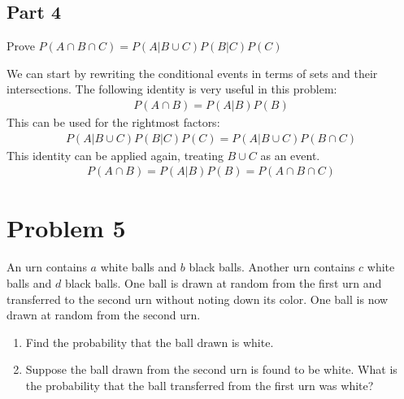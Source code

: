 \documentclass{article}
\begin{document}
\subsection*{Part 4}
Prove $P(A\cap B \cap C) = P(A|B\cup C) P(B|C) P(C)$

We can start by rewriting the conditional events in terms of sets and their intersections.
The following identity is very useful in this problem:
\begin{align*}
P(A\cap B) = P(A|B)P(B)
\end{align*}
This can be used for the rightmost factors:
\begin{align*}
P(A|B\cup C) P(B|C) P(C) = P(A|B\cup C) P(B\cap C)
\end{align*}
This identity can be applied again, treating $B\cup C$ as an event.
\begin{align*}
\boxed{P(A\cap B) = P(A|B)P(B) = P(A\cap B \cap C)}
\end{align*}
\clearpage

\section*{Problem 5}
An urn contains $a$ white balls and $b$ black balls. Another urn contains $c$ white balls and $d$ black balls. One ball is drawn at random from the first urn and transferred to the second urn without noting down its color. One ball is now drawn at random from the second urn.

\begin{enumerate}
    \item
    Find the probability that the ball drawn is white.
    \item
    Suppose the ball drawn from the second urn is found to be white. What is the probability that the ball transferred from the first urn was white?
    \end{enumerate}
\end{document}
